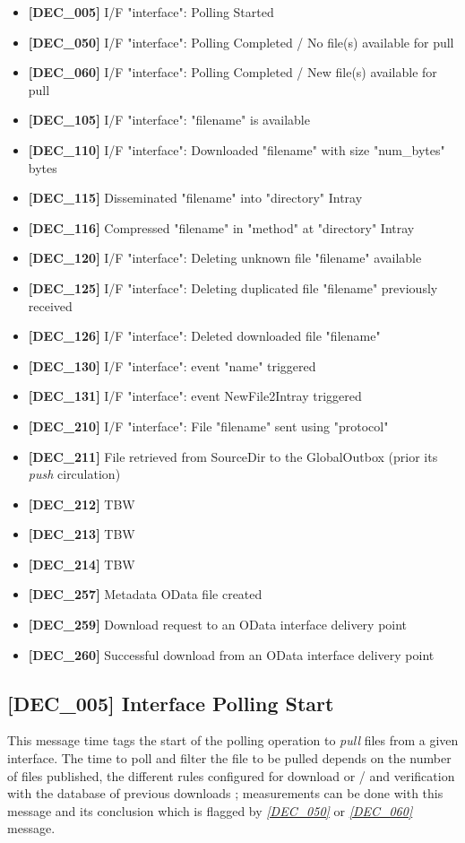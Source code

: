 \documentclass[dec_sum_main.tex]{subfiles}
\begin{document}
\begin{itemize}
	\item \textbf{[DEC\_005]} I/F "interface": Polling Started
	\item \textbf{[DEC\_050]} I/F "interface": Polling Completed / No file(s) available for pull	
	\item \textbf{[DEC\_060]} I/F "interface": Polling Completed / New file(s) available for pull
	\item \textbf{[DEC\_105]} I/F "interface": "filename" is available
	\item \textbf{[DEC\_110]} I/F "interface": Downloaded "filename" with size "num\_bytes" bytes
	\item \textbf{[DEC\_115]} Disseminated "filename" into "directory" Intray
	\item \textbf{[DEC\_116]} Compressed "filename" in "method" at "directory" Intray
	\item \textbf{[DEC\_120]} I/F "interface": Deleting unknown file "filename" available
	\item \textbf{[DEC\_125]} I/F "interface": Deleting duplicated file "filename" previously received 
	\item \textbf{[DEC\_126]} I/F "interface": Deleted downloaded file "filename"
	\item \textbf{[DEC\_130]} I/F "interface": event "name" triggered  	
	\item \textbf{[DEC\_131]} I/F "interface": event NewFile2Intray triggered
	\item \textbf{[DEC\_210]} I/F "interface": File "filename" sent using "protocol"
	\item \textbf{[DEC\_211]} File retrieved from SourceDir to the GlobalOutbox (prior its \textit{push} circulation) 
	\item \textbf{[DEC\_212]} TBW
	\item \textbf{[DEC\_213]} TBW
	\item \textbf{[DEC\_214]} TBW
    \item \textbf{[DEC\_257]} Metadata OData file created	
    \item \textbf{[DEC\_259]} Download request to an OData interface delivery point
    \item \textbf{[DEC\_260]} Successful download from an OData interface delivery point  		
\end{itemize}

\label{DEC005}
\subsection{[DEC\_005] Interface Polling Start}
This message time tags the start of the polling operation to \textit{pull} files from a given interface. The time to poll and filter the file to be pulled depends on the number of files published, the different rules configured for download or / and verification with the database of previous downloads ; measurements can be done with this message and its conclusion which is flagged by \hyperref[DEC050]{\textit{[DEC\_050]}} or \hyperref[DEC060]{\textit{[DEC\_060]}} message.
\end{document}
